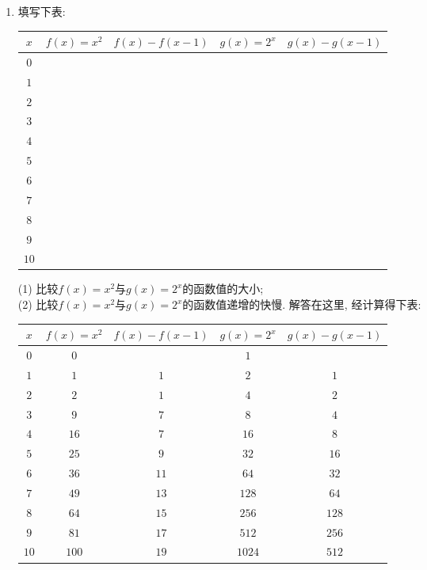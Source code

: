 \documentclass[10pt,a4paper]{article}
\begin{document}
\begin{enumerate}[1.]
\item 填写下表:
\begin{center}
    \begin{tabular}{|c|c|c|c|c|}
        \hline
        $x$	 & $f(x)=x^2$ & $f(x)-f(x-1)$ & $g(x)=2^x$ & $g(x)-g(x-1)$ \\ \hline
        $0$ & & & & \\ \hline
        $1$ & & & & \\ \hline
        $2$ & & & & \\ \hline
        $3$ & & & & \\ \hline
        $4$ & & & & \\ \hline
        $5$ & & & & \\ \hline
        $6$ & & & & \\ \hline
        $7$ & & & & \\ \hline
        $8$ & & & & \\ \hline
        $9$ & & & & \\ \hline
        $10$ & & & & \\ \hline
    \end{tabular}
\end{center}
(1) 比较$f(x)=x^2$与$g(x)=2^x$的函数值的大小;\\
(2) 比较$f(x)=x^2$与$g(x)=2^x$的函数值递增的快慢.
解答在这里,  经计算得下表:
\begin{center}
    \begin{tabular}{|c|c|c|c|c|}
        \hline
        $x$	 & $f(x)=x^2$ & $f(x)-f(x-1)$ & $g(x)=2^x$ & $g(x)-g(x-1)$ \\ \hline
        $0$ & $0$ &  & $1$ & \\ \hline 
        $1$ & $1$ & $1$ & $2$ & $1$ \\  \hline 
        $2$ & $2$ & $1$ & $4$ & $2$\\  \hline 
        $3$ & $9$ & $7$ & $8$ & $4$\\  \hline 
        $4$ & $16$ & $7$ & $16$ & $8$\\  \hline 
        $5$ & $25$ & $9$ & $32$ & $16$\\ \hline 
        $6$ & $36$ & $11$ & $64$ & $32$\\  \hline 
        $7$ & $49$ & $13$ & $128$ & $64$\\ \hline
        $8$ & $64$ & $15$ & $256$ & $128$\\  \hline 
        $9$ & $81$ & $17$ & $512$ & $256$\\  \hline 
        $10$ & $100$ & $19$ & $1024$ & $512$\\ \hline

\end{tabular}
\end{center}
\end{enumerate}
\end{document}
